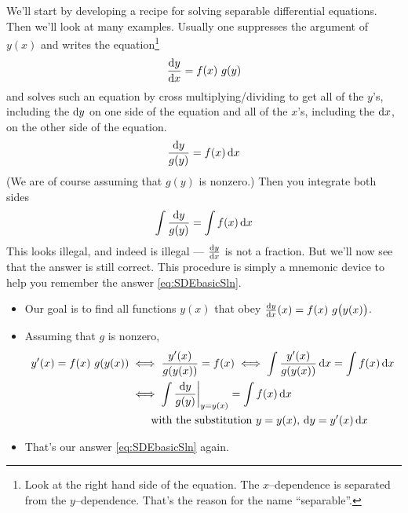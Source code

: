 We'll start by developing a recipe for solving separable differential
equations. Then we'll look at many examples.
Usually one suppresses the argument of $y(x)$  and writes the
equation\footnote{Look at the right hand side of the equation.
The $x$--dependence is separated from the $y$--dependence. That's
the reason for the name ``separable''.}
\begin{equation*}
\diff{y}{x} = f(x)\ g(y)
\end{equation*}
and solves such an equation by cross multiplying/dividing
to get all of the $y$'s, including the $\mathrm{d}y$ on one side of
the equation and all of the $x$'s, including the $\mathrm{d}x$, on the
other side of the equation.
\begin{equation*}
\frac{\mathrm{d}y}{g(y)}=f(x)\,\mathrm{d}x
\end{equation*}
(We are of course assuming that $g(y)$ is nonzero.)
Then you integrate both sides
\begin{equation}\label{eq:SDEbasicSln}
\int\frac{\mathrm{d}y}{g(y)}=\int f(x)\,\mathrm{d}x
\end{equation}
This looks illegal, and indeed is illegal --- $\diff{y}{x}$ is not a fraction.
But we'll now see that the answer is still correct. This procedure is simply
a mnemonic device to help you remember the answer \eqref{eq:SDEbasicSln}.
\begin{itemize}
\item
Our goal is to find all functions $y(x)$ that obey
$
\diff{y}{x}(x) = f(x)\ g\big(y(x)\big)
$.
\item
Assuming that $g$ is nonzero,
\begin{align*}
y'(x) = f(x)\ g(y(x))
&\iff \frac{y'(x)}{g(y(x))}=f(x)
\iff \int\frac{y'(x)}{g(y(x))}\,\mathrm{d}x= \int f(x)\,\mathrm{d}x \\
&\iff \int\frac{\mathrm{d}y}{g(y)}\bigg|_{y=y(x)}= \int f(x)\,\mathrm{d}x \\
&\qquad \text{with the substitution $y=y(x)$, $\mathrm{d}y = y'(x)\,\mathrm{d}x$}
\end{align*}
\item
That's our answer \eqref{eq:SDEbasicSln} again.
\end{itemize}


